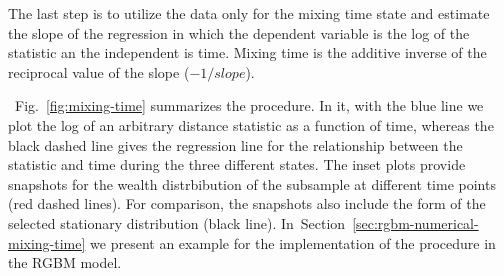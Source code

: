 \documentclass[11pt]{article}
\newcommand{\Sref}[1]{Section~\ref{sec:#1}}
\newcommand{\fref}[1]{Fig.~\ref{fig:#1}}
\numberwithin{equation}{section}
\begin{document}
The last step is to utilize the data only for the mixing time state and estimate the slope of the regression in which the dependent variable is the log of the statistic an the independent is time. Mixing time is the additive inverse of the reciprocal value of the slope ($-1 / slope$).

~\fref{mixing-time} summarizes the procedure. In it, with the blue line we plot the log of an arbitrary distance statistic as a function of time, whereas the black dashed line gives the regression line for the relationship between the statistic and time during the three different states. The inset plots provide snapshots for the wealth distrbibution of the subsample at different time points (red dashed lines). For comparison, the snapshots also include the form of the selected stationary distribution (black line). In~\Sref{rgbm-numerical-mixing-time} we present an example for the implementation of the procedure in the RGBM model.
\end{document}
